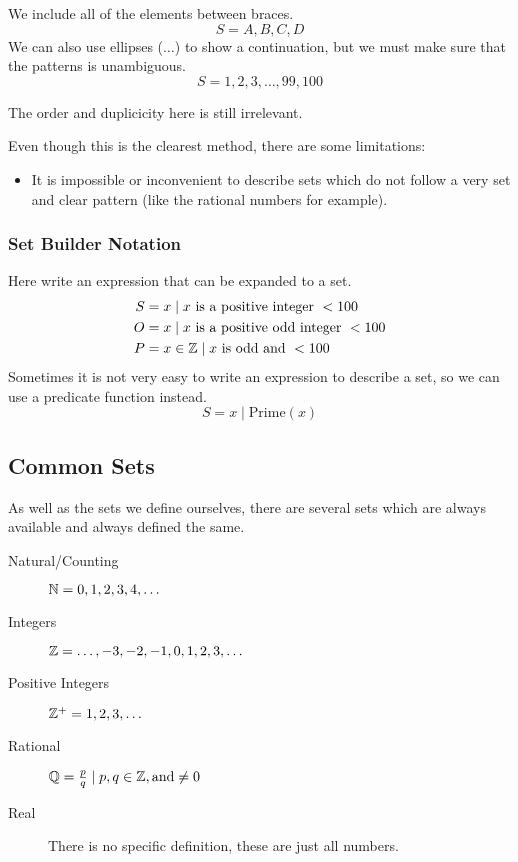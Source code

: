 We include all of the elements between braces.
\[
    S = {A, B, C, D}
\]
We can also use ellipses (\(\dots\)) to show a continuation, but we must make sure that the patterns is unambiguous.
\[
    S = {1, 2, 3, \dots, 99, 100}
\]
\begin{note}
    The order and duplicicity here is still irrelevant.
\end{note}
Even though this is the clearest method, there are some limitations:
\begin{itemize}
    \item It is impossible or inconvenient to describe sets which do not follow a very set and clear pattern (like the rational numbers for example).
\end{itemize}

\subsubsection{Set Builder Notation}\label{ssub:set_builder_notation}

Here write an expression that can be expanded to a set.
\begin{align*}
    S & = {x \mid x \text{ is a positive integer } < 100}     \\
    O & = {x \mid x \text{ is a positive odd integer } < 100} \\
    P & = {x \in \mathbb{Z} \mid x \text{ is odd and } < 100}
\end{align*}
Sometimes it is not very easy to write an expression to describe a set, so we can use a predicate function instead.
\[
    S={x \mid \mathrm{Prime}(x)}
\]

\subsection{Common Sets}\label{sub:common_sets}

As well as the sets we define ourselves, there are several sets which are always available and always defined the same.

\begin{description}
    \item[Natural/Counting] \(\mathbb{N} = {0, 1, 2, 3, 4, \dots}\)
    \item[Integers] \(\mathbb{Z} = {\dots, -3, -2, -1, 0, 1, 2, 3, \dots}\)
    \item[Positive Integers] \(\mathbb{Z}^{+} = {1, 2, 3, \dots}\)
    \item[Rational] \(\mathbb{Q}={\frac{p}{q} \mid p, q \in \mathbb{Z}, \text{and} \neq 0}\)
    \item[Real] There is no specific definition, these are just all numbers.
\end{description}

